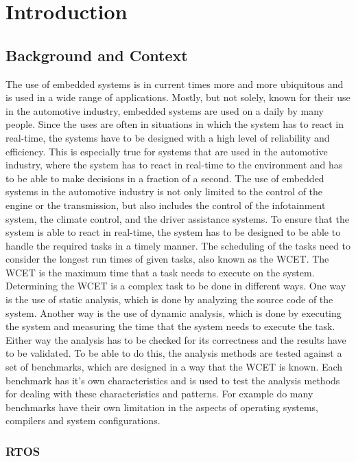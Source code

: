 \chapter{Introduction}
\section{Background and Context}
The use of embedded systems is in current times more and more ubiquitous and is used in a wide range of applications. 
Mostly, but not solely, known for their use in the automotive industry, embedded systems are used on a daily by many people.
Since the uses are often in situations in which the system has to react in real-time, the systems have to be designed with a high level of reliability and efficiency.
This is especially true for systems that are used in the automotive industry, where the system has to react in real-time to the environment and has to be able to make decisions in a fraction of a second.
The use of embedded systems in the automotive industry is not only limited to the control of the engine or the transmission, but also includes the control of the infotainment system, the climate control, and the driver assistance systems.
To ensure that the system is able to react in real-time, the system has to be designed to be able to handle the required tasks in a timely manner.
The scheduling of the tasks need to consider the longest run times of given tasks, also known as the \ac{WCET}.
The \ac{WCET} is the maximum time that a task needs to execute on the system.
Determining the \ac{WCET} is a complex task to be done in different ways.
One way is the use of static analysis, which is done by analyzing the source code of the system.
Another way is the use of dynamic analysis, which is done by executing the system and measuring the time that the system needs to execute the task.
Either way the analysis has to be checked for its correctness and the results have to be validated.
To be able to do this, the analysis methods are tested against a set of benchmarks, which are designed in a way that the \ac{WCET} is known.
Each benchmark has it's own characteristics and is used to test the analysis methods for dealing with these characteristics and patterns.
For example do many benchmarks have their own limitation in the aspects of operating systems, compilers and system configurations. \cite{falk_taclebench_2016}

\subsection{RTOS}


